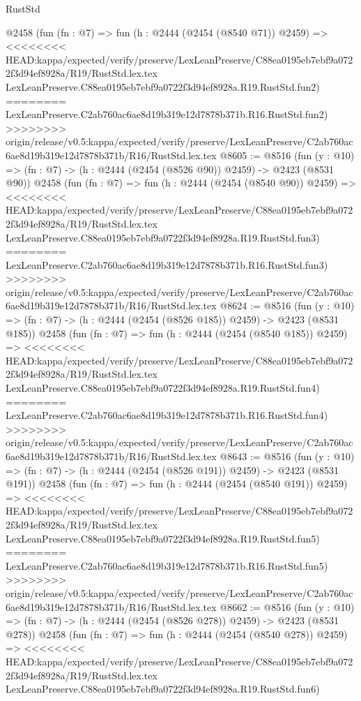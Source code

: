 \begin{lexlean}{RustStd}
\begin{coremodule}
{\begin{coremodule}
{{{{{{{{{{{{    @2458
    (fun (fn : @7) =>
    fun (h : @2444 (@2454 (@8540 @71)) @2459) =>
<<<<<<<< HEAD:kappa/expected/verify/preserve/LexLeanPreserve/C88ea0195eb7ebf9a0722f3d94ef8928a/R19/RustStd.lex.tex
    LexLeanPreserve.C88ea0195eb7ebf9a0722f3d94ef8928a.R19.RustStd.fun2)
========
    LexLeanPreserve.C2ab760ac6ae8d19b319e12d7878b371b.R16.RustStd.fun2)
>>>>>>>> origin/release/v0.5:kappa/expected/verify/preserve/LexLeanPreserve/C2ab760ac6ae8d19b319e12d7878b371b/R16/RustStd.lex.tex
@8605 := @8516
    (fun (y : @10) => (fn : @7) -> (h : @2444 (@2454 (@8526 @90)) @2459) -> @2423 (@8531 @90))
    @2458
    (fun (fn : @7) =>
    fun (h : @2444 (@2454 (@8540 @90)) @2459) =>
<<<<<<<< HEAD:kappa/expected/verify/preserve/LexLeanPreserve/C88ea0195eb7ebf9a0722f3d94ef8928a/R19/RustStd.lex.tex
    LexLeanPreserve.C88ea0195eb7ebf9a0722f3d94ef8928a.R19.RustStd.fun3)
========
    LexLeanPreserve.C2ab760ac6ae8d19b319e12d7878b371b.R16.RustStd.fun3)
>>>>>>>> origin/release/v0.5:kappa/expected/verify/preserve/LexLeanPreserve/C2ab760ac6ae8d19b319e12d7878b371b/R16/RustStd.lex.tex
@8624 := @8516
    (fun (y : @10) => (fn : @7) -> (h : @2444 (@2454 (@8526 @185)) @2459) -> @2423 (@8531 @185))
    @2458
    (fun (fn : @7) =>
    fun (h : @2444 (@2454 (@8540 @185)) @2459) =>
<<<<<<<< HEAD:kappa/expected/verify/preserve/LexLeanPreserve/C88ea0195eb7ebf9a0722f3d94ef8928a/R19/RustStd.lex.tex
    LexLeanPreserve.C88ea0195eb7ebf9a0722f3d94ef8928a.R19.RustStd.fun4)
========
    LexLeanPreserve.C2ab760ac6ae8d19b319e12d7878b371b.R16.RustStd.fun4)
>>>>>>>> origin/release/v0.5:kappa/expected/verify/preserve/LexLeanPreserve/C2ab760ac6ae8d19b319e12d7878b371b/R16/RustStd.lex.tex
@8643 := @8516
    (fun (y : @10) => (fn : @7) -> (h : @2444 (@2454 (@8526 @191)) @2459) -> @2423 (@8531 @191))
    @2458
    (fun (fn : @7) =>
    fun (h : @2444 (@2454 (@8540 @191)) @2459) =>
<<<<<<<< HEAD:kappa/expected/verify/preserve/LexLeanPreserve/C88ea0195eb7ebf9a0722f3d94ef8928a/R19/RustStd.lex.tex
    LexLeanPreserve.C88ea0195eb7ebf9a0722f3d94ef8928a.R19.RustStd.fun5)
========
    LexLeanPreserve.C2ab760ac6ae8d19b319e12d7878b371b.R16.RustStd.fun5)
>>>>>>>> origin/release/v0.5:kappa/expected/verify/preserve/LexLeanPreserve/C2ab760ac6ae8d19b319e12d7878b371b/R16/RustStd.lex.tex
@8662 := @8516
    (fun (y : @10) => (fn : @7) -> (h : @2444 (@2454 (@8526 @278)) @2459) -> @2423 (@8531 @278))
    @2458
    (fun (fn : @7) =>
    fun (h : @2444 (@2454 (@8540 @278)) @2459) =>
<<<<<<<< HEAD:kappa/expected/verify/preserve/LexLeanPreserve/C88ea0195eb7ebf9a0722f3d94ef8928a/R19/RustStd.lex.tex
    LexLeanPreserve.C88ea0195eb7ebf9a0722f3d94ef8928a.R19.RustStd.fun6)
}}}}}}}}}}}}
\end{coremodule}}
\end{coremodule}
\end{lexlean}
